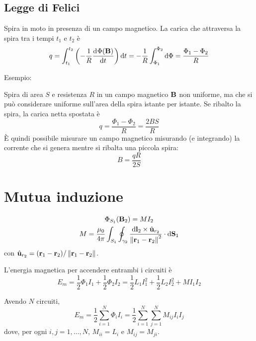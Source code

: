 \subsection{Legge di Felici}

Spira in moto in presenza di un campo magnetico.
La carica che attraversa la spira tra i tempi $t_1$ e $t_2$ è
\begin{equation}
    q = \int_{t_1}^{t_2} \pts{-\frac{1}{R} \der[\Phi(\B)]{t}}\de t
    = -\frac{1}{R} \int_{\Phi_1}^{\Phi_2} \de \Phi
    = \frac{\Phi_1 - \Phi_2}{R}
\end{equation}

Esempio:

Spira di area $S$ e resistenza $R$ in un campo magnetico $\mathbf{B}$ non uniforme, ma che si può considerare uniforme sull'area della spira istante per istante.
Se ribalto la spira, la carica netta spostata è
\begin{equation}
    q = \frac{\Phi_1 - \Phi_2}{R} = \frac{2 B S}{R}
\end{equation}
È quindi possibile misurare un campo magnetico misurando (e integrando) la corrente che si genera mentre si ribalta una piccola spira:
\begin{equation}
    B = \frac{qR}{2S}
\end{equation}

\section{Mutua induzione}

\begin{gather}
    \Phi_{S_1}(\mathbf{B}_2) = M I_2 \\
    M = \frac{\mu_0}{4\pi} \int_{S_1} \oint_{\gamma_2} \frac{\mathrm{d} \mathbf{l}_2 \times \hat{\mathbf{u}}_{r_2}}{\left\lVert \mathbf{r}_1 - \mathbf{r}_2 \right\rVert^2} \cdot \mathrm{d} \mathbf{S}_1
\end{gather}
con $\hat{\mathbf{u}}_{r_2} = (\mathbf{r}_1 - \mathbf{r}_2) / \left\lVert \mathbf{r}_1 - \mathbf{r}_2 \right\rVert$.

L'energia magnetica per accendere entrambi i circuiti è
\begin{equation}
    E_m = \frac{1}{2} \Phi_1 I_1 + \frac{1}{2} \Phi_2 I_2
    = \frac{1}{2} L_1 I_1^2 + \frac{1}{2} L_2 I_2^2 + M I_1 I_2
\end{equation}

Avendo $N$ circuiti,
\begin{equation}
    E_m = \frac{1}{2} \sum_{i = 1}^N \Phi_i I_i
    = \frac{1}{2} \sum_{i = 1}^N \sum_{j = 1}^N M_{ij} I_i I_j
\end{equation}
dove, per ogni $i, j = 1, \ldots, N$, $M_{ii} = L_i$ e $M_{ij} = M_{ji}$.

